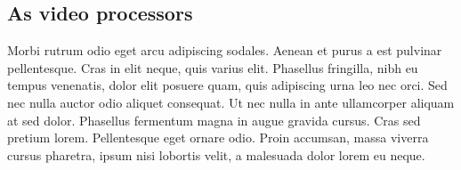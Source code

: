 \subsection{As video processors}
Morbi rutrum odio eget arcu adipiscing sodales. Aenean et purus a est pulvinar pellentesque. Cras in elit neque, quis varius elit. Phasellus fringilla, nibh eu tempus venenatis, dolor elit posuere quam, quis adipiscing urna leo nec orci. Sed nec nulla auctor odio aliquet consequat. Ut nec nulla in ante ullamcorper aliquam at sed dolor. Phasellus fermentum magna in augue gravida cursus. Cras sed pretium lorem. Pellentesque eget ornare odio. Proin accumsan, massa viverra cursus pharetra, ipsum nisi lobortis velit, a malesuada dolor lorem eu neque.